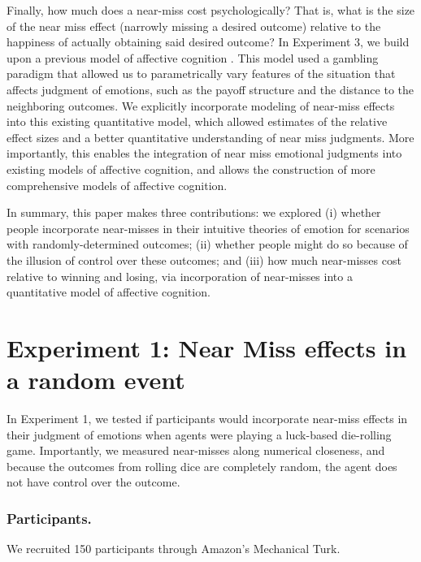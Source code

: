 \documentclass[10pt,letterpaper]{article}
\newcommand{\red}[1]{\textcolor{Red}{#1}}
\begin{document}
	Finally, how much does a near-miss cost psychologically? That is, what is the size of the near miss effect (narrowly missing a desired outcome) relative to the happiness of actually obtaining said desired outcome? In Experiment 3, we build upon a previous model of affective cognition \cite{OngAffCog}. This model used a gambling paradigm that allowed us to parametrically vary features of the situation that affects judgment of emotions, such as the payoff structure and the distance to the neighboring outcomes. We explicitly incorporate modeling of near-miss effects into this existing quantitative model, which allowed estimates of the relative effect sizes and a better quantitative understanding of near miss judgments. More importantly, this enables the integration of near miss emotional judgments into existing models of affective cognition, and allows the construction of more comprehensive models of affective cognition.  

	In summary, this paper makes three contributions: we explored (i) whether people incorporate near-misses in their intuitive theories of emotion for scenarios with randomly-determined outcomes; (ii) whether people might do so because of the illusion of control over these outcomes; and (iii) how much near-misses cost relative to winning and losing, via incorporation of near-misses into a quantitative model of affective cognition.










\section{Experiment 1: Near Miss effects in a random event}

In Experiment 1, we tested if participants would incorporate near-miss effects in their judgment of emotions when agents were playing a luck-based die-rolling game. Importantly, we measured near-misses along numerical closeness, and because the outcomes from rolling dice are completely random, the agent does not have control over the outcome.

\subsubsection{Participants.} We recruited 150 participants through Amazon's Mechanical Turk.
\end{document}
